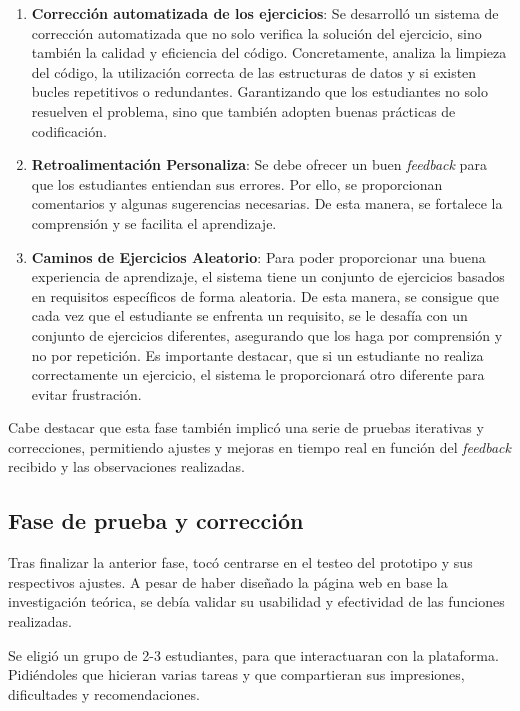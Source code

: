 \begin{enumerate}
    \item \textbf{Corrección automatizada de los ejercicios}: Se desarrolló un sistema de corrección automatizada que no solo verifica la solución del ejercicio, sino también la calidad y eficiencia del código. Concretamente, analiza la limpieza del código, la utilización correcta de las estructuras de datos y si existen bucles repetitivos o redundantes. Garantizando que los estudiantes no solo resuelven el problema, sino que también adopten buenas prácticas de codificación.

    \item \textbf{Retroalimentación Personaliza}: Se debe ofrecer un buen \textit{feedback} para que los estudiantes entiendan sus errores. Por ello, se proporcionan comentarios y algunas sugerencias necesarias. De esta manera, se fortalece la comprensión y se facilita el aprendizaje.

    \item \textbf{Caminos de Ejercicios Aleatorio}: Para poder proporcionar una buena experiencia de aprendizaje, el sistema tiene un conjunto de ejercicios basados en requisitos específicos de forma aleatoria. De esta manera, se consigue que cada vez que el estudiante se enfrenta un requisito, se le desafía con un conjunto de ejercicios diferentes, asegurando que los haga por comprensión y no por repetición. Es importante destacar, que si un estudiante no realiza correctamente un ejercicio, el sistema le proporcionará otro diferente para evitar frustración.
\end{enumerate}

Cabe destacar que esta fase también implicó una serie de pruebas iterativas y correcciones, permitiendo ajustes y mejoras en tiempo real en función del \textit{feedback} recibido y las observaciones realizadas.

\subsection{Fase de prueba y corrección}

Tras finalizar la anterior fase, tocó centrarse en el testeo del prototipo y sus respectivos ajustes. A pesar de haber diseñado la página web en base la investigación teórica, se debía validar su usabilidad y efectividad de las funciones realizadas.

Se eligió un grupo de 2-3 estudiantes, para que interactuaran con la plataforma. 
Pidiéndoles que hicieran varias tareas y que compartieran sus impresiones, dificultades y recomendaciones.

